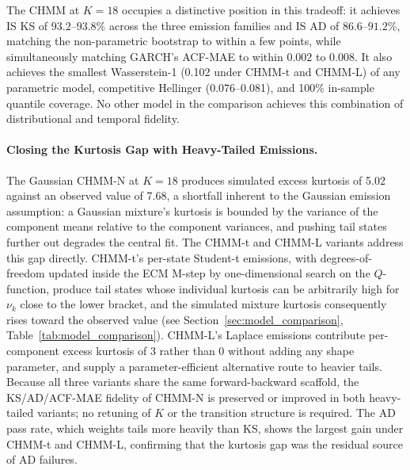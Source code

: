 The CHMM at $K = 18$ occupies a distinctive position in this tradeoff: it achieves IS KS of $93.2$--$93.8\%$ across the three emission families and IS AD of $86.6$--$91.2\%$, matching the non-parametric bootstrap to within a few points, while simultaneously matching GARCH's ACF-MAE to within $0.002$ to $0.008$.
It also achieves the smallest Wasserstein-1 (0.102 under CHMM-t and CHMM-L) of any parametric model, competitive Hellinger (0.076--0.081), and 100\% in-sample quantile coverage.
No other model in the comparison achieves this combination of distributional and temporal fidelity.

\paragraph{Closing the Kurtosis Gap with Heavy-Tailed Emissions.}
The Gaussian CHMM-N at $K = 18$ produces simulated excess kurtosis of 5.02 against an observed value of 7.68, a shortfall inherent to the Gaussian emission assumption: a Gaussian mixture's kurtosis is bounded by the variance of the component means relative to the component variances, and pushing tail states further out degrades the central fit.
The CHMM-t and CHMM-L variants address this gap directly.
CHMM-t's per-state Student-t emissions, with degrees-of-freedom updated inside the ECM M-step by one-dimensional search on the $Q$-function, produce tail states whose individual kurtosis can be arbitrarily high for $\nu_k$ close to the lower bracket, and the simulated mixture kurtosis consequently rises toward the observed value (see Section~\ref{sec:model_comparison}, Table~\ref{tab:model_comparison}).
CHMM-L's Laplace emissions contribute per-component excess kurtosis of $3$ rather than $0$ without adding any shape parameter, and supply a parameter-efficient alternative route to heavier tails.
Because all three variants share the same forward-backward scaffold, the KS/AD/ACF-MAE fidelity of CHMM-N is preserved or improved in both heavy-tailed variants; no retuning of $K$ or the transition structure is required.
The AD pass rate, which weights tails more heavily than KS, shows the largest gain under CHMM-t and CHMM-L, confirming that the kurtosis gap was the residual source of AD failures.

